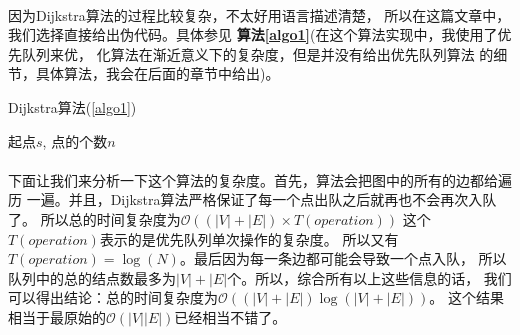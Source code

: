 \documentclass{article}
\begin{document}
		\paragraph{}
			因为Dijkstra算法的过程比较复杂，不太好用语言描述清楚，
			所以在这篇文章中，我们选择直接给出伪代码。具体参见
			\textbf{算法\ref{algo1}}(在这个算法实现中，我使用了优先队列来优，
			化算法在渐近意义下的复杂度，但是并没有给出优先队列算法
			的细节，具体算法，我会在后面的章节中给出)。
			\begin{algorithm}[!h]
				\caption{Dijkstra算法(\ref{algo1})}
				\begin{algorithmic}[1]
					 {起点$s$, 点的个数$n$}
						\EndFor
							\EndIf
								\EndIf
							\EndFor
						\EndWhile
					\EndFunction
				\end{algorithmic}
				\label{algo1}
			\end{algorithm}
		\paragraph{}
			下面让我们来分析一下这个算法的复杂度。首先，算法会把图中的所有的边都给遍历
			一遍。并且，Dijkstra算法严格保证了每一个点出队之后就再也不会再次入队了。
			所以总的时间复杂度为$\mathcal{O}\left((|V|+|E|)\times T(operation)\right)$
			这个$T(operation)$表示的是优先队列单次操作的复杂度。
			所以又有$T(operation) = \log (N)$。最后因为每一条边都可能会导致一个点入队，
			所以队列中的总的结点数最多为$|V| + |E|$个。所以，综合所有以上这些信息的话，
			我们可以得出结论：总的时间复杂度为$\mathcal{O}\left((|V|+|E|)\log (|V|+|E|)\right)$。
			这个结果相当于最原始的$\mathcal{O}(|V||E|)$已经相当不错了。
\end{document}
